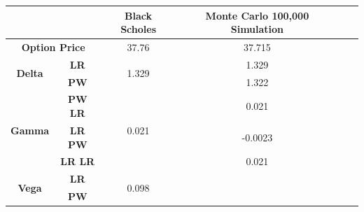\documentclass[11pt,a4paper,fleqn,draft]{article}
\begin{document}
\begin{tabular}{|c|c|c|c|c|c|}
\hline
\multicolumn{2}{|l|}{}             & \textbf{Black Scholes} & \textbf{Monte Carlo 100,000 Simulation} \\ \hline
\multicolumn{2}{|c|}{\textbf{Option Price}}      & 37.76 &  37.715       \\ \hline
\multirow{2}{*}{\textbf{Delta}} & \textbf{LR}    & \multirow{2}{*}{1.329}                &1.329      \\
                                & \textbf{PW}    &                                          & 1.322              \\ \hline
\multirow{3}{*}{\textbf{Gamma}} & \textbf{PW LR} & \multirow{3}{*}{0.021}                 & 0.021       \\
                                & \textbf{LR PW} &                                           & -0.0023      \\
                                & \textbf{LR LR} &                                          & 0.021        \\ \hline
\multirow{2}{*}{\textbf{Vega}}  & \textbf{LR}    & \multirow{2}{*}{0.098} &          \\
                                & \textbf{PW}    &                                             &          \\ \hline
\end{tabular}\\
\end{document}
